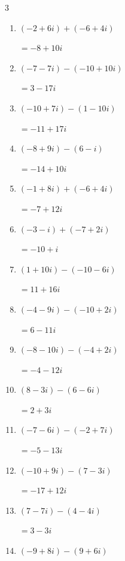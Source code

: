 \begin{multicols}{3}
\begin{enumerate}
  \item $\displaystyle (-2+6i) + (-6+4i)$

        $\displaystyle =-8+10i$

  \item $\displaystyle (-7-7i) - (-10+10i)$

        $\displaystyle =3-17i$

  \item $\displaystyle (-10+7i) - (1-10i)$

        $\displaystyle =-11+17i$

  \item $\displaystyle (-8+9i) - (6-i)$

        $\displaystyle =-14+10i$

  \item $\displaystyle (-1+8i) + (-6+4i)$

        $\displaystyle =-7+12i$

  \item $\displaystyle (-3-i) + (-7+2i)$

        $\displaystyle =-10+i$

  \item $\displaystyle (1+10i) - (-10-6i)$

        $\displaystyle =11+16i$

  \item $\displaystyle (-4-9i) - (-10+2i)$

        $\displaystyle =6-11i$

  \item $\displaystyle (-8-10i) - (-4+2i)$

        $\displaystyle =-4-12i$

  \item $\displaystyle (8-3i) - (6-6i)$

        $\displaystyle =2+3i$

  \item $\displaystyle (-7-6i) - (-2+7i)$

        $\displaystyle =-5-13i$

  \item $\displaystyle (-10+9i) - (7-3i)$

        $\displaystyle =-17+12i$

  \item $\displaystyle (7-7i) - (4-4i)$

        $\displaystyle =3-3i$

  \item $\displaystyle (-9+8i) - (9+6i)$


\end{enumerate}
\end{multicols}
